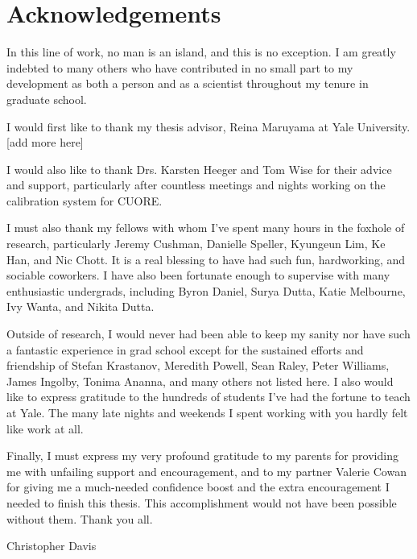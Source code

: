 \chapter*{Acknowledgements}
In this line of work, no man is an island, and this is no exception. I am greatly indebted to many others who have contributed in no small part to my development as both a person and as a scientist throughout my tenure in graduate school.

I would first like to thank my thesis advisor, Reina Maruyama at Yale University. [add more here]

I would also like to thank Drs. Karsten Heeger and Tom Wise for their advice and support, particularly after countless meetings and nights working on the calibration system for CUORE.

I must also thank my fellows with whom I've spent many hours in the foxhole of research, particularly Jeremy Cushman, Danielle Speller, Kyungeun Lim, Ke Han, and Nic Chott. It is a real blessing to have had such fun, hardworking, and sociable coworkers. I have also been fortunate enough to supervise with many enthusiastic undergrads, including Byron Daniel, Surya Dutta, Katie Melbourne, Ivy Wanta, and Nikita Dutta.

Outside of research, I would never had been able to keep my sanity nor have such a fantastic experience in grad school except for the sustained efforts and friendship of Stefan Krastanov, Meredith Powell, Sean Raley, Peter Williams, James Ingolby, Tonima Ananna, and many others not listed here. I also would like to express gratitude to the hundreds of students I've had the fortune to teach at Yale. The many late nights and weekends I spent working with you hardly felt like work at all.

Finally, I must express my very profound gratitude to my parents for providing me with unfailing support and encouragement, and to my partner Valerie Cowan for giving me a much-needed confidence boost and the extra encouragement I needed to finish this thesis. This accomplishment would not have been possible without them. Thank you all.

Christopher Davis
